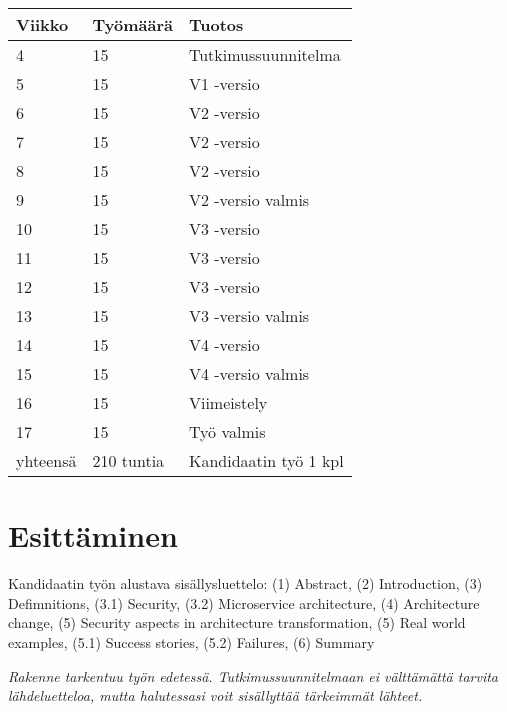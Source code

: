 \documentclass[12pt,a4paper,finnish,oneside]{article}
\begin{document}
\begin{tabular}{|p{20mm}|p{30mm}|p{95mm}|}
\hline
Viikko   & Työmäärä   & Tuotos                \\ \hline
4        & 15         & Tutkimussuunnitelma   \\ \hline
5        & 15         & V1 -versio            \\ \hline
6        & 15         & V2 -versio            \\ \hline
7        & 15         & V2 -versio            \\ \hline
8        & 15         & V2 -versio            \\ \hline
9        & 15         & V2 -versio valmis     \\ \hline
10       & 15         & V3 -versio            \\ \hline
11       & 15         & V3 -versio            \\ \hline
12       & 15         & V3 -versio            \\ \hline
13       & 15         & V3 -versio valmis     \\ \hline
14       & 15         & V4 -versio            \\ \hline
15       & 15         & V4 -versio valmis     \\ \hline
16       & 15         & Viimeistely           \\ \hline
17       & 15         & Työ valmis            \\ \hline
yhteensä & 210 tuntia & Kandidaatin työ 1 kpl \\ \hline
\end{tabular}


\section{Esittäminen}

Kandidaatin työn alustava sisällysluettelo:
(1) Abstract,
(2) Introduction,
(3) Defimnitions,
(3.1) Security,
(3.2) Microservice architecture,
(4) Architecture change,
(5) Security aspects in architecture transformation,
(5) Real world examples,
(5.1) Success stories,
(5.2) Failures,
(6) Summary

%

\emph{Rakenne tarkentuu työn edetessä. Tutkimussuunnitelmaan ei välttämättä tarvita lähdeluetteloa, mutta halutessasi voit sisällyttää tärkeimmät lähteet.}

%


% 

\renewcommand{\refname}{Lähteet}  %



\end{document}

